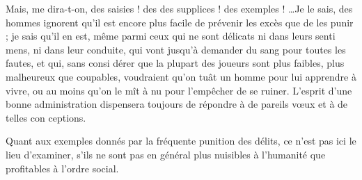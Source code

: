 Mais, me dira-t-on, des saisies ! des
des supplices ! des exemples ! \ldots Je
le sais, des hommes ignorent qu'il
est encore plus facile de prévenir
les excès que de les punir ; je sais
qu'il en est, même parmi ceux qui
ne sont délicats ni dans leurs senti%
mens, ni dans leur conduite, qui
vont jusqu'à demander du sang pour
toutes les fautes, et qui, sans consi%
dérer que la plupart des joueurs sont
plus faibles, plus malheureux que
coupables, voudraient qu'on tuât
un homme pour lui apprendre à
vivre, ou au moins qu'on le mît à
nu pour l'empêcher de se ruiner.
L'esprit d'une bonne administration
dispensera toujours de répondre à
de pareils vœux et à de telles con%
ceptions.

Quant aux exemples donnés par
la fréquente punition des délits, ce
n'est pas ici le lieu d'examiner, s'ils
ne sont pas en général plus nuisibles
à l'humanité que profitables à l'ordre
social.

